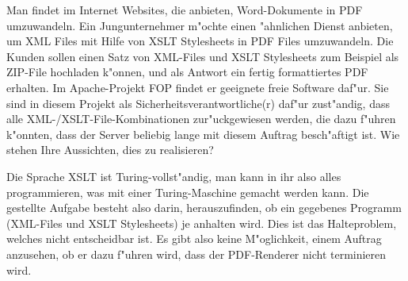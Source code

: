 Man findet im Internet Websites, die anbieten, Word-Dokumente in PDF
umzuwandeln.
Ein Jungunternehmer m"ochte einen "ahnlichen Dienst anbieten, um XML Files
mit Hilfe von XSLT Stylesheets in PDF Files umzuwandeln.
Die Kunden sollen einen Satz von XML-Files und XSLT Stylesheets zum
Beispiel als ZIP-File hochladen k"onnen, und als Antwort ein fertig
formattiertes PDF erhalten.
Im Apache-Projekt FOP findet er geeignete freie Software daf"ur.
Sie sind in diesem Projekt als Sicherheitsverantwortliche(r) daf"ur zust"andig,
dass alle XML-/XSLT-File-Kombinationen zur"uckgewiesen werden, die dazu f"uhren
k"onnten, dass der Server beliebig lange mit diesem Auftrag besch"aftigt ist.
Wie stehen Ihre Aussichten, dies zu realisieren?

\begin{loesung}
Die Sprache XSLT ist Turing-vollst"andig, man kann in ihr also alles
programmieren, was mit einer Turing-Maschine gemacht werden kann.
Die gestellte Aufgabe besteht also darin, herauszufinden, ob ein
gegebenes Programm (XML-Files und XSLT Stylesheets) je anhalten wird.
Dies ist das Halteproblem, welches nicht entscheidbar ist.
Es gibt also keine M"oglichkeit, einem Auftrag anzusehen, ob er dazu
f"uhren wird, dass der PDF-Renderer nicht terminieren wird.
\end{loesung}

